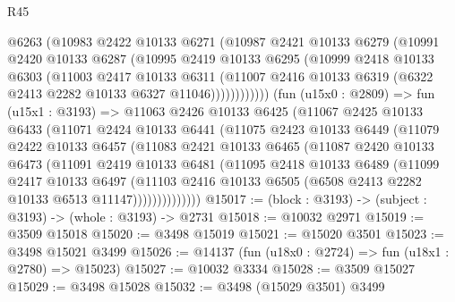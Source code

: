 \begin{lexlean}{R45}
\begin{coremodule}
                @6263
                (@10983
                  @2422
                  @10133
                  @6271
                  (@10987
                    @2421
                    @10133
                    @6279
                    (@10991
                      @2420
                      @10133
                      @6287
                      (@10995
                        @2419
                        @10133
                        @6295
                        (@10999
                          @2418
                          @10133
                          @6303
                          (@11003
                            @2417
                            @10133
                            @6311
                            (@11007
                              @2416
                              @10133
                              @6319
                              (@6322 @2413 @2282 @10133 @6327 @11046))))))))))))
        (fun (u15x0 : @2809) =>
        fun (u15x1 : @3193) =>
        @11063
          @2426
          @10133
          @6425
          (@11067
            @2425
            @10133
            @6433
            (@11071
              @2424
              @10133
              @6441
              (@11075
                @2423
                @10133
                @6449
                (@11079
                  @2422
                  @10133
                  @6457
                  (@11083
                    @2421
                    @10133
                    @6465
                    (@11087
                      @2420
                      @10133
                      @6473
                      (@11091
                        @2419
                        @10133
                        @6481
                        (@11095
                          @2418
                          @10133
                          @6489
                          (@11099
                            @2417
                            @10133
                            @6497
                            (@11103
                              @2416
                              @10133
                              @6505
                              (@6508 @2413 @2282 @10133 @6513 @11147))))))))))))))
@15017 := (block : @3193) -> (subject : @3193) -> (whole : @3193) -> @2731
@15018 := @10032 @2971
@15019 := @3509 @15018
@15020 := @3498 @15019
@15021 := @15020 @3501
@15023 := @3498 @15021 @3499
@15026 := @14137 (fun (u18x0 : @2724) => fun (u18x1 : @2780) => @15023)
@15027 := @10032 @3334
@15028 := @3509 @15027
@15029 := @3498 @15028
@15032 := @3498 (@15029 @3501) @3499

\end{coremodule}
\end{lexlean}
